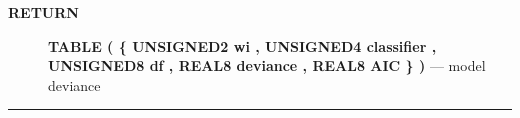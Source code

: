 \par
\begin{description}
\item [\colorbox{tagtype}{\color{white} \textbf{\textsf{RETURN}}}] \textbf{TABLE ( \{ UNSIGNED2 wi , UNSIGNED4 classifier , UNSIGNED8 df , REAL8 deviance , REAL8 AIC \} )} --- model deviance
\end{description}




\rule{\linewidth}{0.5pt}
